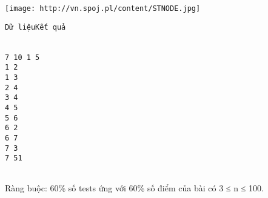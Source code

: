 \texttt{[image: http://vn.spoj.pl/content/STNODE.jpg]}
\begin{verbatim}
Dữ liệuKết quả


7 10 1 5
1 2
1 3
2 4
3 4
4 5
5 6
6 2
6 7
7 3
7 51


\end{verbatim}

Ràng buộc: 60\% số tests ứng với 60\% số điểm của bài có 3 ≤ n ≤ 100.